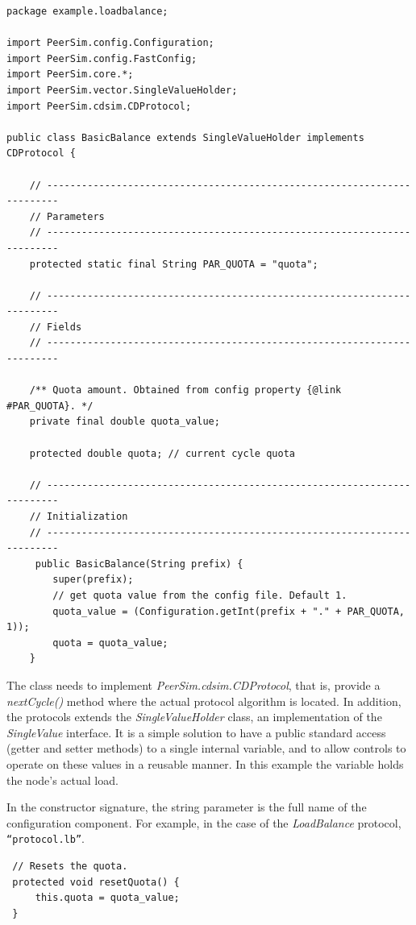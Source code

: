 \documentclass[a4paper,11pt]{article}
\begin{document}
\footnotesize
\begin{verbatim}
package example.loadbalance;

import PeerSim.config.Configuration;
import PeerSim.config.FastConfig;
import PeerSim.core.*;
import PeerSim.vector.SingleValueHolder;
import PeerSim.cdsim.CDProtocol;

public class BasicBalance extends SingleValueHolder implements CDProtocol {

    // ------------------------------------------------------------------------
    // Parameters
    // ------------------------------------------------------------------------
    protected static final String PAR_QUOTA = "quota";

    // ------------------------------------------------------------------------
    // Fields
    // ------------------------------------------------------------------------

    /** Quota amount. Obtained from config property {@link #PAR_QUOTA}. */
    private final double quota_value;

    protected double quota; // current cycle quota

    // ------------------------------------------------------------------------
    // Initialization
    // ------------------------------------------------------------------------
     public BasicBalance(String prefix) {
        super(prefix);
        // get quota value from the config file. Default 1.
        quota_value = (Configuration.getInt(prefix + "." + PAR_QUOTA, 1));
        quota = quota_value;
    }
\end{verbatim}
\normalsize

The class needs to
implement \emph{PeerSim.cdsim.CDProtocol}, that is, provide a
\emph{nextCycle()} method 
where the actual protocol algorithm is located.
In addition, the protocols extends the \emph{SingleValueHolder} class,
an implementation of the \emph{SingleValue} interface. It is a simple
solution to have a public standard access (getter and setter methods)
to a single internal variable, and to allow controls to operate on
these values in a reusable manner. In this example the variable holds the
node's actual load.

In the constructor signature, the string parameter 
is the full name of the configuration component.
For example, in the case of the \emph{LoadBalance} protocol,
\texttt{``protocol.lb''}.

\footnotesize
\begin{verbatim}
 // Resets the quota. 
 protected void resetQuota() {
     this.quota = quota_value;
 }
\end{verbatim}
\normalsize
\end{document}
